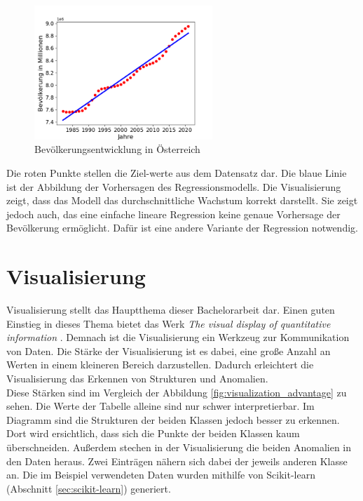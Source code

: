 \begin{figure}
\vspace{-1cm}
\includegraphics[width=0.6\textwidth]{images/population_linear.png}
\caption{Bevölkerungsentwicklung in Österreich}
\label{fig:pop_linear}
\vspace{-2.5cm}
\end{figure}

\noindent Die roten Punkte stellen die Ziel-\linebreak werte aus dem Datensatz dar. Die blaue Linie ist der Abbildung der Vorhersagen des Regressionsmodells. Die Visualisierung zeigt, dass das Modell das durchschnittliche Wachstum korrekt darstellt. Sie zeigt jedoch auch, das eine einfache lineare Regression keine genaue Vorhersage der Bevölkerung ermöglicht. Dafür ist eine andere Variante der Regression notwendig.

\vfill

\section{Visualisierung}
\label{sec:Visualisierung}


Visualisierung stellt das Hauptthema dieser Bachelorarbeit dar. Einen guten Einstieg in dieses Thema bietet das Werk \emph{The visual display of quantitative information} \parencite{TufteEdward}. Demnach ist die Visualisierung ein Werkzeug zur Kommunikation von Daten. Die Stärke der Visualisierung ist es dabei, eine große Anzahl an Werten in einem kleineren Bereich darzustellen. Dadurch erleichtert die Visualisierung das Erkennen von Strukturen und Anomalien.\\
\noindent Diese Stärken sind im Vergleich der Abbildung  \ref{fig:visualization_advantage} zu sehen. Die Werte der Tabelle alleine sind nur schwer interpretierbar. Im Diagramm sind die Strukturen der beiden Klassen jedoch besser zu erkennen. Dort wird ersichtlich, dass sich die Punkte der beiden Klassen kaum überschneiden. Außerdem stechen in der Visualisierung die beiden Anomalien in den Daten heraus. Zwei Einträgen nähern sich dabei der jeweils anderen Klasse an. Die im Beispiel verwendeten Daten wurden mithilfe von Scikit-learn (Abschnitt \ref{sec:scikit-learn}) generiert.

